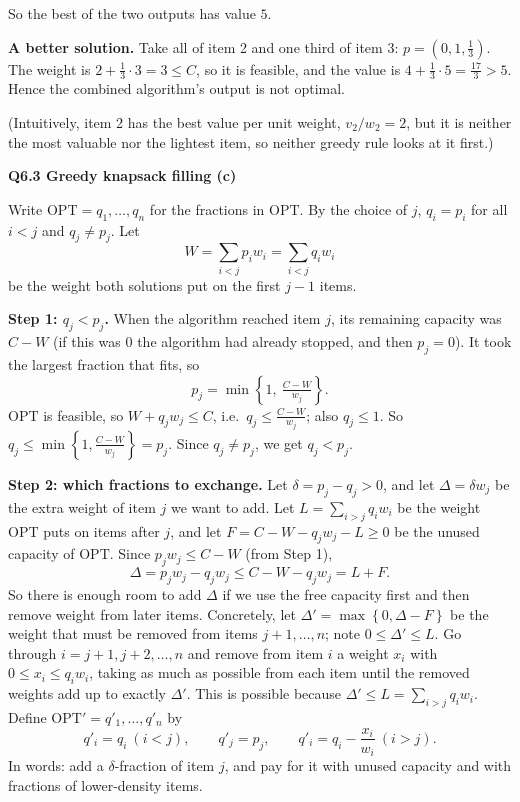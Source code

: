 \documentclass[11pt]{article}
\newcommand{\set}[1]{\left\{#1\right\}}
\newcommand{\OPT}{\mathrm{OPT}}
\newcommand{\qpage}[1]{\clearpage\noindent\textbf{\large #1}\par\medskip}
\begin{document}
So the best of the two outputs has value $5$.

\textbf{A better solution.}
Take all of item 2 and one third of item 3: $p = (0, 1, \tfrac13)$.
The weight is $2 + \tfrac13 \cdot 3 = 3 \le C$, so it is feasible, and the value is $4 + \tfrac13 \cdot 5 = \tfrac{17}{3} > 5$.
Hence the combined algorithm's output is not optimal.

(Intuitively, item 2 has the best value per unit weight, $v_2/w_2 = 2$, but it is neither the most valuable nor the lightest item, so neither greedy rule looks at it first.)
    

\qpage{Q6.3 Greedy knapsack filling (c)}

Write $\OPT = q_1,\dots,q_n$ for the fractions in $\OPT$.
By the choice of $j$, $q_i = p_i$ for all $i < j$ and $q_j \ne p_j$.
Let
\[
  W = \sum_{i<j} p_i w_i = \sum_{i<j} q_i w_i
\]
be the weight both solutions put on the first $j-1$ items.

\textbf{Step 1: $q_j < p_j$.}
When the algorithm reached item $j$, its remaining capacity was $C - W$ (if this was $0$ the algorithm had already stopped, and then $p_j = 0$).
It took the largest fraction that fits, so
\[
  p_j = \min\set{1,\ \tfrac{C-W}{w_j}}.
\]
$\OPT$ is feasible, so $W + q_j w_j \le C$, i.e.\ $q_j \le \frac{C-W}{w_j}$; also $q_j \le 1$.
So $q_j \le \min\set{1, \frac{C-W}{w_j}} = p_j$.
Since $q_j \ne p_j$, we get $q_j < p_j$.

\textbf{Step 2: which fractions to exchange.}
Let $\delta = p_j - q_j > 0$, and let $\Delta = \delta w_j$ be the extra weight of item $j$ we want to add.
Let $L = \sum_{i > j} q_i w_i$ be the weight $\OPT$ puts on items after $j$, and let $F = C - W - q_j w_j - L \ge 0$ be the unused capacity of $\OPT$.
Since $p_j w_j \le C - W$ (from Step 1),
\[
  \Delta = p_j w_j - q_j w_j \le C - W - q_j w_j = L + F .
\]
So there is enough room to add $\Delta$ if we use the free capacity first and then remove weight from later items.
Concretely, let $\Delta' = \max\set{0, \Delta - F}$ be the weight that must be removed from items $j+1,\dots,n$; note $0 \le \Delta' \le L$.
Go through $i = j+1, j+2, \dots, n$ and remove from item $i$ a weight $x_i$ with $0 \le x_i \le q_i w_i$, taking as much as possible from each item until the removed weights add up to exactly $\Delta'$.
This is possible because $\Delta' \le L = \sum_{i>j} q_i w_i$.
Define $\OPT' = q'_1,\dots,q'_n$ by
\[
  q'_i = q_i \ (i<j), \qquad q'_j = p_j, \qquad q'_i = q_i - \frac{x_i}{w_i} \ (i>j).
\]
In words: add a $\delta$-fraction of item $j$, and pay for it with unused capacity and with fractions of lower-density items.
\end{document}
